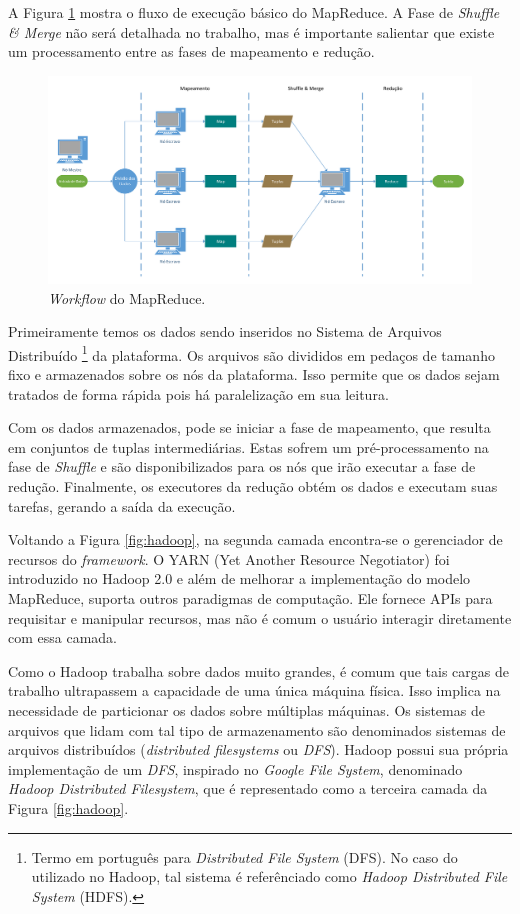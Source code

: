 A Figura \ref{fig:mrworkflow} mostra o fluxo de execução básico do MapReduce. 
A Fase de \emph{Shuffle \& Merge} não será detalhada no trabalho, mas é 
importante salientar que existe um processamento entre as fases de mapeamento e 
redução.

\begin{figure}[ht]
 \centerline{\includegraphics[width=1\textwidth]{./img/mapreduce-workflow.pdf}}
 \caption{\emph{Workflow} do MapReduce.}
 \label{fig:mrworkflow}
\end{figure}

Primeiramente temos os dados sendo inseridos no Sistema de Arquivos Distribuído 
\footnote{Termo em português para \emph{Distributed File System} (DFS). No caso 
do utilizado no Hadoop, tal sistema é referênciado como \emph{Hadoop Distributed 
File System} (HDFS).} da plataforma. Os arquivos são divididos em pedaços de 
tamanho fixo e armazenados sobre os nós da plataforma. Isso permite que os dados 
sejam tratados de forma rápida pois há paralelização em sua leitura.

Com os dados armazenados, pode se iniciar a fase de mapeamento, que resulta em 
conjuntos de tuplas intermediárias. Estas sofrem um pré-processamento na fase 
de \emph{Shuffle} e são disponibilizados para os nós que irão executar a fase 
de redução. Finalmente, os executores da redução obtém os dados e executam suas 
tarefas, gerando a saída da execução.

Voltando a Figura \ref{fig:hadoop}, na segunda camada encontra-se o gerenciador de recursos 
do \emph{framework}. O YARN (Yet Another Resource Negotiator) foi introduzido no Hadoop 2.0
e além de melhorar a implementação do modelo MapReduce, suporta outros paradigmas de computação.
Ele fornece APIs para requisitar e manipular recursos, mas não é comum o usuário interagir 
diretamente com essa camada.

Como o Hadoop trabalha sobre dados muito grandes, é comum que tais cargas de trabalho
ultrapassem a capacidade de uma única máquina física. Isso implica na necessidade de particionar
os dados sobre múltiplas máquinas. Os sistemas de arquivos que lidam com tal tipo de armazenamento são
denominados sistemas de arquivos distribuídos (\textit{distributed filesystems} ou \textit{DFS}).
Hadoop possui sua própria implementação de um \textit{DFS}, inspirado no \textit{Google File System},
denominado \textit{Hadoop Distributed Filesystem}, que é representado como a terceira camada da Figura \ref{fig:hadoop}.

